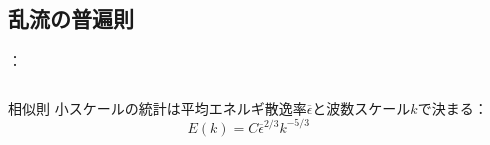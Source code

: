\documentclass[12pt,dvipdfmx,svgnames,uplatex,aspectratio=169]{beamer}
\begin{document}
\subsection{乱流の普遍則}
\begin{frame}{\insertsection：\insertsubsection}
  \begin{columns}[c]
    \begin{column}{0.6\textwidth}
      \begin{block}{相似則}
        小スケールの統計は平均エネルギ散逸率\(\overline{\epsilon}\)と波数スケール\(k\)で決まる：
        \begin{equation*}
          E(k) = C \overline{\epsilon}^{2/3} k^{-5/3}
        \end{equation*}
      \end{block}
    \end{column}
    \begin{column}{0.4\textwidth}
      \centering
    \end{column}
  \end{columns}
\end{frame}


\end{document}
